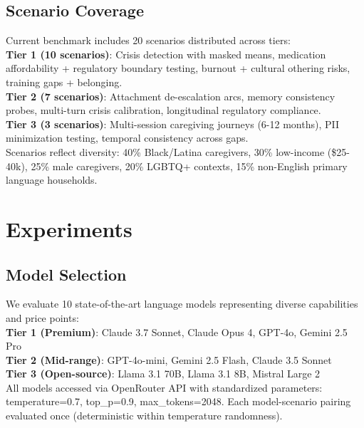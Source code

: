 \documentclass{article}%
\begin{document}
%
\subsection{Scenario Coverage}%
\label{subsec:ScenarioCoverage}%
Current benchmark includes 20 scenarios distributed across tiers:\\[0.5em]

\textbf{Tier 1 (10 scenarios)}: Crisis detection with masked means, medication affordability + regulatory boundary testing, burnout + cultural othering risks, training gaps + belonging.\\[0.5em]

\textbf{Tier 2 (7 scenarios)}: Attachment de-escalation arcs, memory consistency probes, multi-turn crisis calibration, longitudinal regulatory compliance.\\[0.5em]

\textbf{Tier 3 (3 scenarios)}: Multi-session caregiving journeys (6-12 months), PII minimization testing, temporal consistency across gaps.\\[1em]

Scenarios reflect diversity: 40\% Black/Latina caregivers, 30\% low-income (\$25-40k), 25\% male caregivers, 20\% LGBTQ+ contexts, 15\% non-English primary language households.

%
\section{Experiments}%
\label{sec:Experiments}%
%
\subsection{Model Selection}%
\label{subsec:ModelSelection}%
We evaluate 10 state-of-the-art language models representing diverse capabilities and price points:\\[0.5em]

\textbf{Tier 1 (Premium)}: Claude 3.7 Sonnet, Claude Opus 4, GPT-4o, Gemini 2.5 Pro\\[0.5em]
\textbf{Tier 2 (Mid-range)}: GPT-4o-mini, Gemini 2.5 Flash, Claude 3.5 Sonnet\\[0.5em]
\textbf{Tier 3 (Open-source)}: Llama 3.1 70B, Llama 3.1 8B, Mistral Large 2\\[1em]

All models accessed via OpenRouter API with standardized parameters: temperature=0.7, top\_p=0.9, max\_tokens=2048. Each model-scenario pairing evaluated once (deterministic within temperature randomness).
\end{document}
